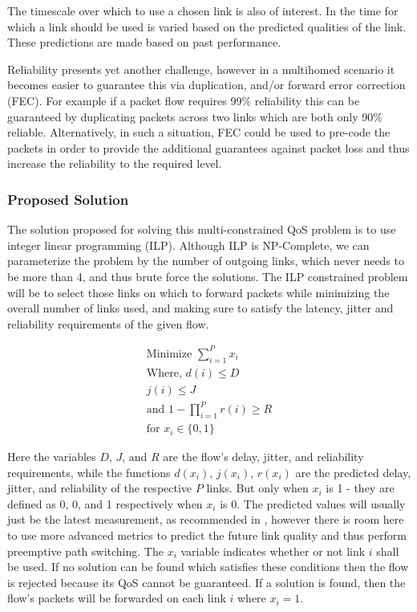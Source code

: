The timescale over which to use a chosen link is also of interest. In \cite{habib2007improving} the time for which a link should be used is varied based on the predicted qualities of the link. These predictions are made based on past performance.

Reliability presents yet another challenge, however in a multihomed scenario it becomes easier to guarantee this via duplication, and/or forward error correction (FEC). For example if a packet flow requires 99\% reliability this can be guaranteed by duplicating packets across two links which are both only 90\% reliable. Alternatively, in such a situation, FEC could be used to pre-code the packets in order to provide the additional guarantees against packet loss and thus increase the reliability to the required level.

\subsubsection{Proposed Solution}

The solution proposed for solving this multi-constrained QoS problem is to use integer linear programming (ILP). Although ILP is NP-Complete, we can parameterize the problem by the number of outgoing links, which never needs to be more than 4, and thus brute force the solutions. The ILP constrained problem will be to select those links on which to forward packets while minimizing the overall number of links used, and making sure to satisfy the latency, jitter and reliability requirements of the given flow.

\begin{gather}
\text{Minimize } \sum_{i=1}^{P}x_i \\
\text{Where, } d(i) \le D \\
j(i) \le J\\
\text{and }1 - \prod_{i=1}^{P}{r(i)} \ge R \\
\text{for } x_i \in \{0,1\}
\end{gather}

Here the variables $D$, $J$, and $R$ are the flow's delay, jitter, and reliability requirements, while the functions $d(x_i)$, $j(x_i)$, $r(x_i)$ are the predicted delay, jitter, and reliability of the respective $P$ links. But only when $x_i$ is 1 - they are defined as 0, 0, and 1 respectively when $x_i$ is 0. The predicted values will usually just be the latest measurement, as recommended in 
\cite{akella2008performance}, however there is room here to use more advanced metrics to predict the future link quality and thus perform preemptive path switching. The $x_i$ variable indicates whether or not link $i$ shall be used. If no solution can be found which satisfies these conditions then the flow is rejected because its QoS cannot be guaranteed. If a solution is found, then the flow's packets will be forwarded on each link $i$ where $x_i = 1$.

